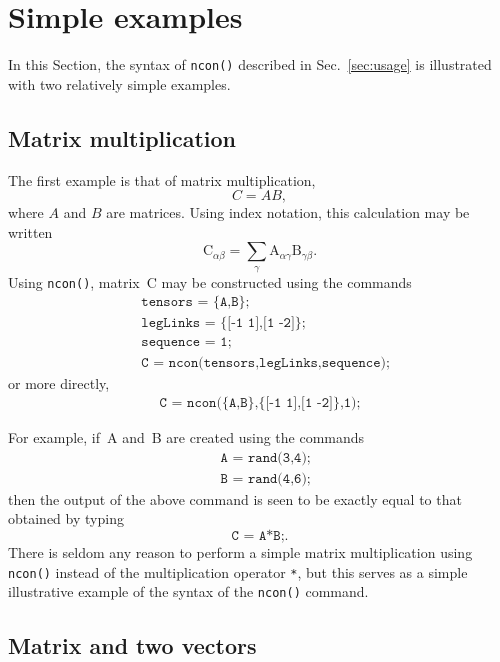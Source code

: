 \documentclass[aps,prb,reprint,superscriptaddress,amsmath,amsfonts]{revtex4-1}
\theoremstyle{definition}
\newcommand{\mrm}[1]{\mathrm{#1}}
\newcommand{\sref}[1]{Sec.~\ref{#1}}
\newcommand{\ttt}[1]{\texttt{#1}}
\begin{document}
\section{Simple examples}

In this Section, the syntax of \ttt{ncon()} described in \sref{sec:usage} is illustrated with two relatively simple examples.

\subsection{Matrix multiplication}

The first example is that of matrix multiplication, $$C=AB,$$ where $A$ and $B$ are matrices. Using index notation, this calculation may be written
\begin{equation}
\mrm{C}_{\alpha\beta} = \sum_\gamma \mrm{A}_{\alpha\gamma} \mrm{B}_{\gamma\beta}.
\end{equation}
Using \ttt{ncon()}, matrix~C may be constructed using the commands
\begin{align*}
&\ttt{tensors = \{A,B\};}\\
&\ttt{legLinks = \{[-1 1],[1 -2]\};}\\
&\ttt{sequence = 1;}\\
&\ttt{C = ncon(tensors,legLinks,sequence);}
\end{align*}
or more directly,
\begin{align*}
\ttt{C = ncon(\{A,B\},\{[-1 1],[1 -2]\},1);}
\end{align*}

For example, if~A and~B are created using the commands
\begin{align*}
&\ttt{A = rand(3,4);}\\
&\ttt{B = rand(4,6);}
\end{align*}
then the output of the above command is seen to be exactly equal to that obtained by typing 
\begin{equation*}
\ttt{C = A*B;}. 
\end{equation*}
There is seldom any reason to perform a simple matrix multiplication using \ttt{ncon()} instead of the multiplication operator \ttt{*}, but this serves as a simple illustrative example of the syntax of the \ttt{ncon()} command.

\subsection{Matrix and two vectors}
\end{document}
